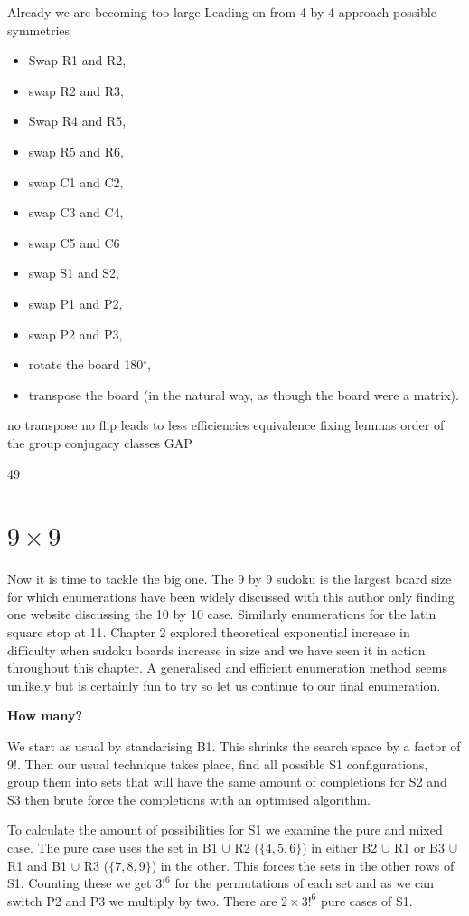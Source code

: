 \documentclass[a4paper,11pt]{report}
\newcounter{row}
\begin{document}
Already we are becoming too large
Leading on from 4 by 4 approach
possible symmetries
\begin{itemize}
\item Swap R1 and R2,
\item swap R2 and R3,
\item Swap R4 and R5,
\item swap R5 and R6,
\item swap C1 and C2,
\item swap C3 and C4,
\item swap C5 and C6
\item swap S1 and S2,
\item swap P1 and P2,
\item swap P2 and P3,
\item rotate the board 180$^\circ$,
\item transpose the board (in the natural way, as though the board were a matrix).
\end{itemize}
no transpose
no flip
leads to less efficiencies
equivalence 
fixing lemmas
order of the group
conjugacy classes
GAP 

49
	\section{$9 \times  9$}

Now it is time to tackle the big one. The 9 by 9 sudoku is the largest board size for which enumerations have been widely discussed with this author only finding one website discussing the 10 by 10 case. Similarly enumerations for the latin square stop at 11. Chapter 2 explored theoretical exponential increase in difficulty when sudoku boards increase in size and we have seen it in action throughout this chapter. A generalised and efficient enumeration method seems unlikely but is certainly fun to try so let us continue to our final enumeration.

\textbf{How many?}

We start as usual by standarising B1. This shrinks the search space by a factor of 9!. Then our usual technique takes place, find all possible S1 configurations, group them into sets that will have the same amount of completions for S2 and S3 then brute force the completions with an optimised algorithm.

To calculate the amount of possibilities for S1 we examine the pure and mixed case. The pure case uses the set  in B1 $\cup$ R2 ($\{4,5,6\}$) in either B2 $\cup$ R1 or B3 $\cup$ R1 and B1 $\cup$ R3 ($\{7,8,9\}$) in the other. This forces the sets in the other rows of S1. Counting these we get $3!^6$ for the permutations of each set and as we can switch P2 and P3 we multiply by two. There are $2\times 3!^6$ pure cases of S1. 
\end{document}
